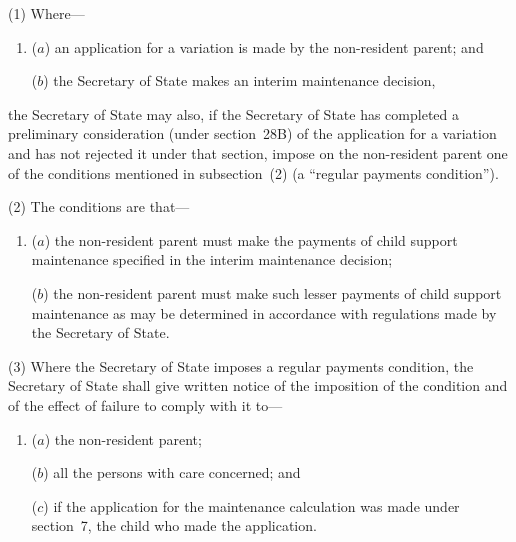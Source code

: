 \documentclass[12pt,a4paper]{article}
\begin{document}
(1) Where—
\begin{enumerate}\item[]
($a$) an application for a variation is made by the non-resident parent; and

($b$) the 
Secretary of State  %
makes an interim maintenance decision,
\end{enumerate}
the 
Secretary of State  %
may also, if 
the Secretary of State  %
has completed 
a  %
preliminary consideration (under section~28B) of the application for a variation and has not rejected it under that section, impose on the non-resident parent one of the conditions mentioned in subsection~(2)  (a “regular payments condition”).

(2) The conditions are that—
\begin{enumerate}\item[]
($a$) the non-resident parent must make the payments of child support maintenance specified in the interim maintenance decision;

($b$) the non-resident parent must make such lesser payments of child support maintenance as may be determined in accordance with regulations made by the Secretary of State.
\end{enumerate}

(3) Where the 
Secretary of State  %
imposes a regular payments condition, 
the Secretary of State  %
shall give written notice of the imposition of the condition and of the effect of failure to comply with it to—
\begin{enumerate}\item[]
($a$) the non-resident parent;

($b$) all the persons with care concerned; and

($c$) if the application for the maintenance calculation was made under section~7, the child who made the application.
\end{enumerate}
\end{document}
